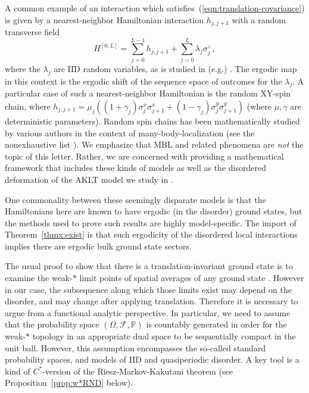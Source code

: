 \documentclass{article}
\renewcommand{\P}{\mathbb{P}}
\newcommand{\<}{\langle}
\renewcommand{\>}{\rangle}
\theoremstyle{definition}
\numberwithin{equation}{section}
\begin{document}
A common example of an interaction which satisfies~(\ref{eqn:translation-covariance}) is given by a nearest-neighbor Hamiltonian interaction $h_{j, j+1}$ with a random transverse field  \[
	H^{[0,L]} = \sum_{j=0}^{L-1} h_{j, j+1} + \sum_{j=0}^L \lambda_j \sigma^z_j\,,
\] where the $\lambda_j$ are IID random variables, as is studied in (e.g.) \cite{Abdul-Rahman_et_al, Baldwin, ElgartKlein24_1, HamzaSimsStolz, Stolz_MBL}. The ergodic map in this context is the ergodic shift of the sequence space of outcomes for the $\lambda_j$. A particular case of such a nearest-neighbor Hamiltonian is the random XY-spin chain, where $h_{j, j+1} = \mu_j ((1+\gamma_j) \sigma_j^x\sigma_{j+1}^x + (1-\gamma_j) \sigma_{j}^y\sigma_{j+1}^y)$ (where $\mu, \gamma$ are deterministic parameters)\cite{Abdul-Rahman_et_al}. Random spin chains has been mathematically studied by various authors in the context of many-body-localization (see the nonexhaustive list \cite{Abdul-Rahman_et_al,  ElgartKlein24_2, ElgartKlein24_1, ElgartKlein_2026,  ElgartKlein25, Imbrie, NachtergaeleReschke, SimsStolz, Stolz_MBL}). We emphasize that MBL and related phenomena are \emph{not} the topic of this letter. Rather, we are concerned with providing a mathematical framework that includes these kinds of models as well as the disordered deformation of the AKLT model we study in \cite{RoonSchenker}. 


One commonality between these seemingly disparate models is that the Hamiltonians here are known to have ergodic (in the disorder) ground states, but the methods used to prove such results are highly model-specific. The import of Theorem~\ref{thmx:exist} is that such ergodicity of the disordered local interactions implies there are ergodic bulk ground state sectors.

The usual proof to show that there is a translation-invariant ground state is to examine the weak-$\ast$ limit points of spatial averages of any ground state \cite{BratteliRobinsonII}. However in our case, the subsequence along which those limits exist may depend on the disorder, and may change after applying translation. Therefore it is necessary to argue from a functional analytic perspective. In particular, we need to assume that the probability space $(\Omega, \mathcal{F}, \P)$ is countably generated in order for the weak-$\ast$ topology in an appropriate dual space to be sequentially compact in the unit ball. However, this assumption encompasses the so-called standard probability spaces, and models of IID and quasiperiodic disorder. A key tool is a kind of $C^*$-version of the Riesz-Markov-Kakutani theorem (see Proposition~\ref{prop:w*RND} below).
\end{document}
